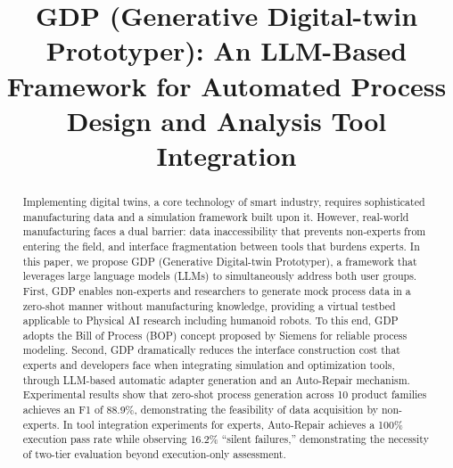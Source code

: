 \documentclass[conference]{IEEEtran}
\begin{document}
\title{GDP (Generative Digital-twin Prototyper): An LLM-Based Framework for Automated Process Design and Analysis Tool Integration}

\author{
\and
{}
}

\maketitle

\begin{abstract}
Implementing digital twins, a core technology of smart industry, requires sophisticated manufacturing data and a simulation framework built upon it. However, real-world manufacturing faces a dual barrier: data inaccessibility that prevents non-experts from entering the field, and interface fragmentation between tools that burdens experts. In this paper, we propose GDP (Generative Digital-twin Prototyper), a framework that leverages large language models (LLMs) to simultaneously address both user groups. First, GDP enables non-experts and researchers to generate mock process data in a zero-shot manner without manufacturing knowledge, providing a virtual testbed applicable to Physical AI research including humanoid robots. To this end, GDP adopts the Bill of Process (BOP) concept proposed by Siemens for reliable process modeling. Second, GDP dramatically reduces the interface construction cost that experts and developers face when integrating simulation and optimization tools, through LLM-based automatic adapter generation and an Auto-Repair mechanism. Experimental results show that zero-shot process generation across 10 product families achieves an F1 of 88.9\%, demonstrating the feasibility of data acquisition by non-experts. In tool integration experiments for experts, Auto-Repair achieves a 100\% execution pass rate while observing 16.2\% ``silent failures,'' demonstrating the necessity of two-tier evaluation beyond execution-only assessment.
\end{abstract}
\end{document}
